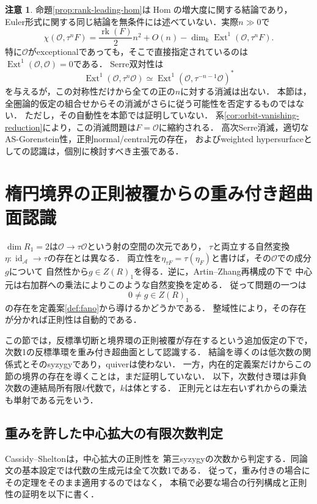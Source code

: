 \documentclass[11pt,a4paper]{ltjsarticle}
\theoremstyle{definition}
\newtheorem{remark}[theorem]{注意}
\newcommand{\OO}{\mathcal O}
\renewcommand{\AA}{\mathcal A}
\newcommand{\Hom}{\operatorname{Hom}}
\newcommand{\Ext}{\operatorname{Ext}}
\newcommand{\rk}{\operatorname{rk}}
\newcommand{\id}{\operatorname{id}}
\begin{document}
\begin{remark}\label{rem:rank-euler-gap}
命題\ref{prop:rank-leading-hom}は$\Hom$の増大度に関する結論であり，
Euler形式に関する同じ結論を無条件には述べていない．実際$n\gg0$で
\[
 \chi(\OO,\tau^nF)
 =\frac{\rk(F)}2n^2+O(n)
   -\dim_k\Ext^1(\OO,\tau^nF).
\]
特に$\OO$がexceptionalであっても，そこで直接指定されているのは
$\Ext^1(\OO,\OO)=0$である．
Serre双対性は
\[
 \Ext^1(\OO,\tau^n\OO)
 \simeq\Ext^1(\OO,\tau^{-n-1}\OO)^*
\]
を与えるが，この対称性だけから全ての正の$n$に対する消滅は出ない．
本節は，全圏論的仮定の組合せからその消滅がさらに従う可能性を否定するものではない．
ただし，その自動性を本節では証明していない．
系\ref{cor:orbit-vanishing-reduction}により，この消滅問題は$F=\OO$に縮約される．
高次Serre消滅，適切なAS-Gorenstein性，正則normal/central元の存在，
およびweighted hypersurfaceとしての認識は，個別に検討すべき主張である．
\end{remark}


\section{楕円境界の正則被覆からの重み付き超曲面認識}
\label{sec:weighted-recognition}

$\dim R_1=2$は$\OO\to\tau\OO$という射の空間の次元であり，
$\tau$と両立する自然変換$\eta:\id_{\AA}\to\tau$の存在とは異なる．
両立性を$\eta_{\tau F}=\tau(\eta_F)$と書けば，その$\OO$での成分$g$について
自然性から$g\in Z(R)_1$を得る．逆に，Artin--Zhang再構成の下で
中心元は右加群への乗法によりこのような自然変換を定める．
従って問題の一つは
\[
 0\ne g\in Z(R)_1
\]
の存在を定義案\ref{def:fano}から導けるかどうかである．
整域性により，その存在が分かれば正則性は自動的である．

この節では，反標準切断と境界環の正則被覆が存在するという追加仮定の下で，
次数1の反標準環を重み付き超曲面として認識する．
結論を導くのは低次数の関係式とそのsyzygyであり，quiverは使わない．
一方，内在的定義案だけからこの節の境界の存在を導くことは，まだ証明していない．
以下，次数付き環は非負次数の連結局所有限$k$代数で，$k$は体とする．
正則元とは左右いずれからの乗法も単射である元をいう．

\subsection{重みを許した中心拡大の有限次数判定}

Cassidy--Shelton\cite[Theorems~3.6--3.7]{CS}は，中心拡大の正則性を
第三syzygyの次数から判定する．同論文の基本設定では代数の生成元は全て次数1である．
従って，重み付きの場合にその定理をそのまま適用するのではなく，
本稿で必要な場合の行列構成と正則性の証明を以下に書く．
\end{document}
